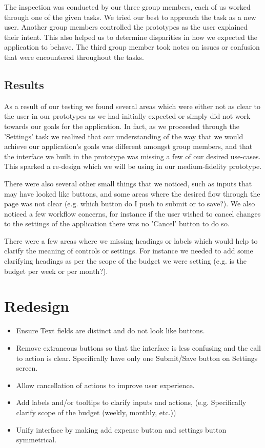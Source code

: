 \documentclass{chi2011}
\begin{document}
    The inspection was conducted by our three group members, each of us worked through one of the given tasks. We
    tried our best to approach the task as a new user. Another group members controlled the prototypes as the user
    explained their intent. This also helped us to determine disparities in how we expected the application to behave.
    The third group member took notes on issues or confusion that were encountered throughout the tasks.

    \subsection{Results} 
    
    As a result of our testing we found several areas which were either not
    as clear to the user in our prototypes as we had initially expected or
    simply did not work towards our goals for the application. In fact, as we
    proceeded through the 'Settings' task we realized that our understanding of
    the way that we would achieve our application's goals was different amongst
    group members, and that the interface we built in the prototype was missing
    a few of our desired use-cases. This sparked a re-design which we will be
    using in our medium-fidelity prototype.

    There were also several other small things that we noticed, such as inputs
    that may have looked like buttons, and some areas where the desired flow
    through the page was not clear (e.g. which button do I push to submit or to
    save?). We also noticed a few workflow concerns, for instance if the user
    wished to cancel changes to the settings of the application there was no
    'Cancel' button to do so.

    There were a few areas where we missing headings or labels which would help
    to clarify the meaning of controls or settings. For instance we needed to
    add some clarifying headings as per the scope of the budget we were setting
    (e.g. is the budget per week or per month?).


\section{Redesign}
    \begin{itemize}
        \item Ensure Text fields are distinct and do not look like buttons.
        \item Remove extraneous buttons so that the interface is less confusing and the call to action is clear.
            Specifically have only one Submit/Save button on Settings screen.
        \item Allow cancellation of actions to improve user experience.
        \item Add labels and/or tooltips to clarify inputs and actions, (e.g. Specifically clarify scope of the budget
            (weekly, monthly, etc.))
        \item Unify interface by making add expense button and settings button symmetrical.
    \end{itemize}
\end{document}
